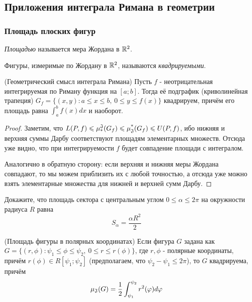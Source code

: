 \subsection{Приложения интеграла Римана в геометрии}

\subsubsection{Площадь плоских фигур}

\begin{definition}
	\textit{Площадью} называется мера Жордана в $\mathbb{R}^2$.
\end{definition}

\begin{definition}
	Фигуры, измеримые по Жордану в $\mathbb{R}^2$, называются \textit{квадрируемыми}.
\end{definition}

\begin{theorem}
	(Геометрический смысл интеграла Римана) Пусть $f$ - неотрицательная интегрируемая по Риману функция на $[a; b]$. Тогда её подграфик (криволинейная трапеция) $G_f = \{(x, y) \colon a \le x \le b,\ 0 \le y \le f(x)\}$ квадрируем, причём его площадь равна $\int_a^b f(x)dx$ и наоборот.
\end{theorem}

\begin{proof}
	Заметим, что $L(P, f) \leqslant \operatorname{\mu^\mathfrak{J}_*}(G_f) \leqslant \operatorname{\mu^*_\mathfrak{J}}(G_f) \leqslant U(P, f)$, ибо нижняя и верхняя суммы Дарбу соответствуют площадям элементарных множеств. Отсюда уже видно, что при интегрируемости $f$ будет совпадение площади с интегралом.
	
	Аналогично в обратную сторону: если верхняя и нижняя меры Жордана совпадают, то мы можем приблизить их с любой точностью, а отсюда уже можно взять элементарные множества для нижней и верхней сумм Дарбу.
\end{proof}

\begin{exercise}
	Докажите, что площадь сектора с центральным углом $0 \le \alpha \le 2\pi$ на окружности радиуса $R$ равна
	\[
		S_\alpha = \frac{\alpha R^2}{2}
	\]
\end{exercise}

\begin{theorem} (Площадь фигуры в полярных координатах)
	Если фигура $G$ задана как $G = \{(r, \phi) \colon \psi_1 \le \phi \le \psi_2,\ 0 \le r \le r(\phi)\}$, где $r, \phi$ - полярные координаты, причём $r(\phi) \in R[\psi_1; \psi_2]$ (предполагаем, что $\psi_2 - \psi_1 \le 2\pi$), то $G$ квадрируема, причём
	\[
		\operatorname{\mu_\mathfrak{J}}(G) = \frac{1}{2} \int_{\psi_1}^{\psi_2} r^2(\varphi)d\varphi
	\]
\end{theorem}


